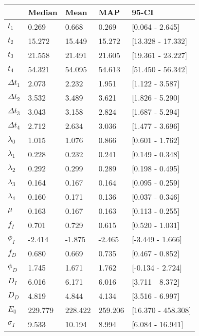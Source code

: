 \begin{tabular}{lllll}
\toprule
{} &   Median &     Mean &      MAP &               95-CI \\
\midrule
$t_1$        &    0.269 &    0.668 &    0.269 &     [0.064 - 2.645] \\
$t_2$        &   15.272 &   15.449 &   15.272 &   [13.328 - 17.332] \\
$t_3$        &   21.558 &   21.491 &   21.605 &   [19.361 - 23.227] \\
$t_4$        &   54.321 &   54.095 &   54.613 &   [51.450 - 56.342] \\
$\Delta t_1$ &    2.073 &    2.232 &    1.951 &     [1.122 - 3.587] \\
$\Delta t_2$ &    3.532 &    3.489 &    3.621 &     [1.826 - 5.290] \\
$\Delta t_3$ &    3.043 &    3.158 &    2.824 &     [1.687 - 5.294] \\
$\Delta t_4$ &    2.712 &    2.634 &    3.036 &     [1.477 - 3.696] \\
$\lambda_0$  &    1.015 &    1.076 &    0.866 &     [0.601 - 1.762] \\
$\lambda_1$  &    0.228 &    0.232 &    0.241 &     [0.149 - 0.348] \\
$\lambda_2$  &    0.292 &    0.299 &    0.289 &     [0.198 - 0.495] \\
$\lambda_3$  &    0.164 &    0.167 &    0.164 &     [0.095 - 0.259] \\
$\lambda_4$  &    0.160 &    0.171 &    0.136 &     [0.037 - 0.346] \\
$\mu$        &    0.163 &    0.167 &    0.163 &     [0.113 - 0.255] \\
$f_I$        &    0.701 &    0.729 &    0.615 &     [0.520 - 1.031] \\
$\phi_I$     &   -2.414 &   -1.875 &   -2.465 &    [-3.449 - 1.666] \\
$f_D$        &    0.680 &    0.669 &    0.735 &     [0.467 - 0.852] \\
$\phi_D$     &    1.745 &    1.671 &    1.762 &    [-0.134 - 2.724] \\
$D_I$        &    6.016 &    6.171 &    6.016 &     [3.711 - 8.372] \\
$D_D$        &    4.819 &    4.844 &    4.134 &     [3.516 - 6.997] \\
$E_0$        &  229.779 &  228.422 &  259.206 &  [16.370 - 458.308] \\
$\sigma_I$   &    9.533 &   10.194 &    8.994 &    [6.084 - 16.941] \\

\end{tabular}
